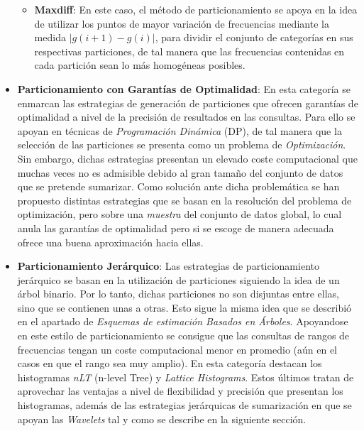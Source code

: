 \documentclass{subfiles}
\begin{document}
\begin{itemize}
\begin{itemize}
              \item \textbf{Maxdiff}: En este caso, el método de particionamiento se apoya en la idea de utilizar los puntos de mayor variación de frecuencias mediante la medida $|g(i+1) - g(i)|$, para dividir el conjunto de categorías en sus respectivas particiones, de tal manera que las frecuencias contenidas en cada partición sean lo más homogéneas posibles.

            \end{itemize}
          \item \textbf{Particionamiento con Garantías de Optimalidad}: En esta categoría se enmarcan las estrategias de generación de particiones que ofrecen garantías de optimalidad a nivel de la precisión de resultados en las consultas. Para ello se apoyan en técnicas de \emph{Programación Dinámica} (DP), de tal manera que la selección de las particiones se presenta como un problema de \emph{Optimización}. Sin embargo, dichas estrategias presentan un elevado coste computacional que muchas veces no es admisible debido al gran tamaño del conjunto de datos que se pretende sumarizar. Como solución ante dicha problemática se han propuesto distintas estrategias que se basan en la resolución del problema de optimización, pero sobre una \emph{muestra} del conjunto de datos global, lo cual anula las garantías de optimalidad pero si se escoge de manera adecuada ofrece una buena aproximación hacia ellas.

          \item \textbf{Particionamiento Jerárquico}: Las estrategias de particionamiento jerárquico se basan en la utilización de particiones siguiendo la idea de un árbol binario. Por lo tanto, dichas particiones no son disjuntas entre ellas, sino que se contienen unas a otras. Esto sigue la misma idea que se describió en el apartado de \emph{Esquemas de estimación Basados en Árboles}. Apoyandose en este estilo de particionamiento se consigue que las consultas de rangos de frecuencias tengan un coste computacional menor en promedio (aún en el casos en que el rango sea muy amplio). En esta categoría destacan los histogramas \emph{nLT} (n-level Tree) y \emph{Lattice Histograms}. Estos últimos tratan de aprovechar las ventajas a nivel de flexibilidad y precisión que presentan los histogramas, además de las estrategias jerárquicas de sumarización en que se apoyan las \emph{Wavelets} tal y como se describe en la siguiente sección.

        \end{itemize}
\end{document}
